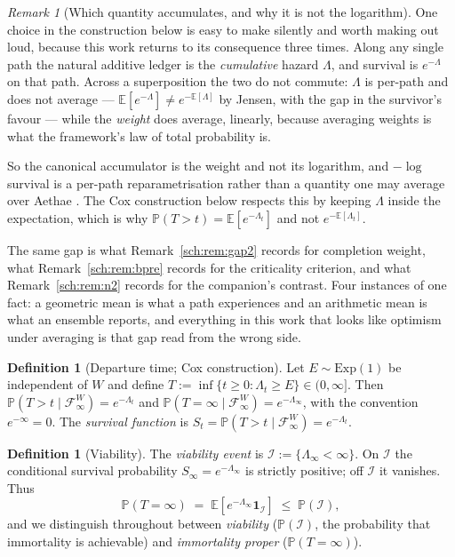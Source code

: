 \documentclass[11pt]{article}
\numberwithin{equation}{section}
\theoremstyle{plain}
\theoremstyle{definition}
\newtheorem{definition}[theorem]{Definition}
\theoremstyle{remark}
\newtheorem{remark}[theorem]{Remark}
\newcommand{\E}{\mathbb{E}}
\newcommand{\PP}{\mathbb{P}}
\newcommand{\one}{\mathbf{1}}
\newcommand{\Imm}{\mathcal{I}}
\newcommand{\Fc}{\mathcal{F}}
\begin{document}
\begin{remark}[Which quantity accumulates, and why it is not the
logarithm]\label{sh:rem:accumulator}
One choice in the construction below is easy to make silently and worth
making out loud, because this work returns to its consequence three
times. Along any single path the natural additive ledger is the
\emph{cumulative} hazard $\Lambda$, and survival is $e^{-\Lambda}$ on
that path. Across a superposition the two do not commute: $\Lambda$ is
per-path and does not average --- $\E[e^{-\Lambda}]\neq e^{-\E[\Lambda]}$
by Jensen, with the gap in the survivor's favour --- while the
\emph{weight} does average, linearly, because averaging weights is what
the framework's law of total probability is.

So the canonical accumulator is the weight and not its logarithm, and
$-\log$ survival is a per-path reparametrisation rather than a quantity
one may average over Aethae \cite{Aethus}. The Cox construction below
respects this by keeping $\Lambda$ inside the expectation, which is why
$\PP(T>t)=\E[e^{-\Lambda_t}]$ and not $e^{-\E[\Lambda_t]}$.

The same gap is what Remark~\ref{sch:rem:gap2} records for completion
weight, what Remark~\ref{sch:rem:bpre} records for the criticality
criterion, and what Remark~\ref{sch:rem:n2} records for the companion's
contrast. Four instances of one fact: a geometric mean is what a path
experiences and an arithmetic mean is what an ensemble reports, and
everything in this work that looks like optimism under averaging is that
gap read from the wrong side.
\end{remark}

\begin{definition}[Departure time; Cox construction]\label{sh:def:cox}
Let $E\sim\mathrm{Exp}(1)$ be independent of $W$ and define
$T:=\inf\{t\ge0:\Lambda_t\ge E\}\in(0,\infty]$. Then
$\PP(T>t\mid\Fc^W_\infty)=e^{-\Lambda_t}$ and
$\PP(T=\infty\mid\Fc^W_\infty)=e^{-\Lambda_\infty}$, with the convention
$e^{-\infty}=0$. The \emph{survival function} is
$S_t=\PP(T>t\mid\Fc^W_\infty)=e^{-\Lambda_t}$.
\end{definition}

\begin{definition}[Viability]\label{sh:def:viab}
The \emph{viability event} is $\Imm:=\{\Lambda_\infty<\infty\}$. On $\Imm$
the conditional survival probability $S_\infty=e^{-\Lambda_\infty}$ is
strictly positive; off $\Imm$ it vanishes. Thus
\begin{equation}\label{sh:eq:twotier}
\PP(T=\infty)\;=\;\E\!\left[e^{-\Lambda_\infty}\one_\Imm\right]
\;\le\;\PP(\Imm),
\end{equation}
and we distinguish throughout between \emph{viability} ($\PP(\Imm)$, the
probability that immortality is achievable) and \emph{immortality proper}
($\PP(T=\infty)$).
\end{definition}
\end{document}
